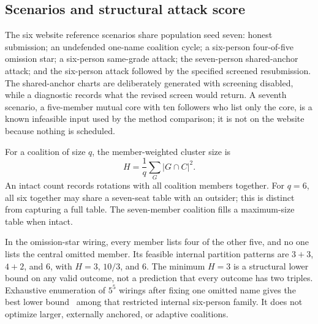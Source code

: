 \documentclass[11pt,a4paper]{article}
\theoremstyle{definition}\newtheorem{definition}[theorem]{Definition}
\theoremstyle{remark}\newtheorem{remark}[theorem]{Remark}
\begin{document}
\subsection{Scenarios and structural attack score}
The six website reference scenarios share population seed seven: honest submission; an undefended one-name coalition cycle; a six-person four-of-five omission star; a six-person same-grade attack; the seven-person shared-anchor attack; and the six-person attack followed by the specified screened resubmission. The shared-anchor charts are deliberately generated with screening disabled, while a diagnostic records what the revised screen would return. A seventh scenario, a five-member mutual core with ten followers who list only the core, is a known infeasible input used by the method comparison; it is not on the website because nothing is scheduled.

For a coalition of size $q$, the member-weighted cluster size is
\begin{equation}
 H=\frac{1}{q}\sum_{G}|G\cap C|^2.
\end{equation}
An intact count records rotations with all coalition members together. For $q=6$, all six together may share a seven-seat table with an outsider; this is distinct from capturing a full table. The seven-member coalition fills a maximum-size table when intact.

In the omission-star wiring, every member lists four of the other five, and no one lists the central omitted member. Its feasible internal partition patterns are $3+3$, $4+2$, and $6$, with $H=3$, $10/3$, and $6$. The minimum $H=3$ is a structural lower bound on any valid outcome, not a prediction that every outcome has two triples. Exhaustive enumeration of $5^5$ wirings after fixing one omitted name gives the best lower bound \StarBound\ among that restricted internal six-person family. It does not optimize larger, externally anchored, or adaptive coalitions.
\end{document}
